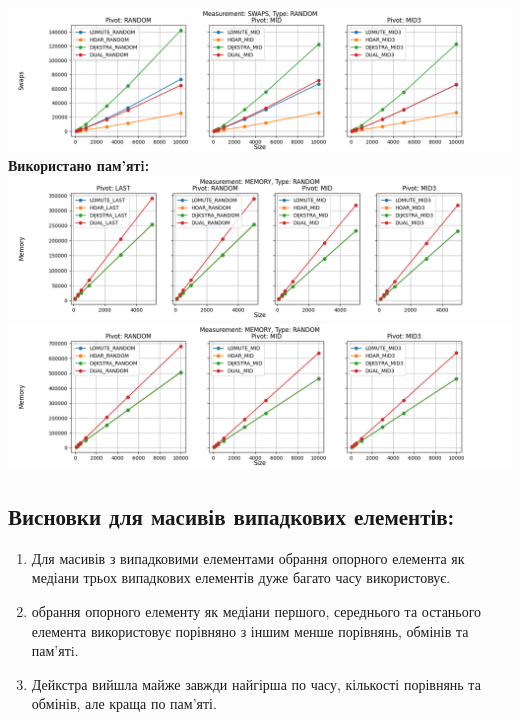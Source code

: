 \documentclass{article}
\begin{document}
        \includegraphics[scale=0.5]{random_Swaps_3_pivots_7_numbers.png}
        \newline
    \newpage
    \textbf{Використано пам’ятi:}
    \newline
        \includegraphics[scale=0.5]{random_Memory_6_numbers.png}
        \includegraphics[scale=0.5]{random_Memory_3_pivots_7_numbers.png}
    \subsection{Висновки для масивів випадкових елементів:}
    \begin{enumerate}
        \item Для масивів з випадковими елементами обрання опорного елемента як медіани трьох випадкових елементів дуже багато часу використовує.
        \item обрання опорного елементу як медіани першого, середнього та останього елемента використовує порівняно з іншим менше порівнянь, обмінів та пам'ятi.
        \item Дейкстра вийшла майже завжди найгірша по часу, кількості порівнянь та обмінів, але краща по пам'яті.
    \end{enumerate}
    \newpage

\end{document}
